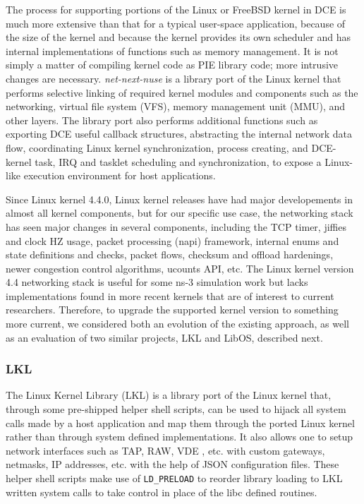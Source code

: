 \documentclass{sig-alternate}
\begin{document}
The process for supporting portions of the Linux or FreeBSD kernel in DCE is
much more extensive than that for a typical user-space application, because of
the size of the kernel and because the kernel provides its own scheduler and has internal implementations of functions such as memory management.  It is not
simply a matter of compiling kernel code as PIE library code; more intrusive
changes are necessary. 
\textit{net-next-nuse} is a library 
port of the Linux kernel that performs selective linking of required kernel modules and components such as the networking, virtual file system (VFS), memory management unit (MMU), and other layers.  The library port also performs additional functions such as
exporting DCE useful callback structures, abstracting the internal network data flow, coordinating Linux kernel synchronization, 
process creating, and DCE-kernel task, IRQ and tasklet scheduling and synchronization, to expose a Linux-like execution environment for host applications. 

Since Linux kernel 4.4.0, Linux kernel releases have had major developements in almost all kernel components, but for our specific use case,
the networking stack has seen major changes in several components, including the TCP timer, jiffies and clock HZ usage, packet processing (napi) framework, internal enums and state definitions and checks, packet flows, checksum and
offload hardenings, newer congestion control algorithms, ucounts API, etc. 
The Linux kernel version 4.4 networking stack is useful for some ns-3 simulation work but lacks implementations found in more recent kernels that are of interest to current researchers.  Therefore, to upgrade the supported kernel version to something more current, we considered both an evolution of the existing approach, as well as an evaluation of two similar projects, LKL and LibOS, described next. 

\subsubsection{LKL}
The Linux Kernel Library (LKL) is a library port of the Linux kernel that, through some pre-shipped helper shell scripts, can be used to hijack
all system calls made by a host application and map them through the ported Linux kernel rather than through system defined implementations. It also allows one 
to setup network interfaces such as TAP, RAW, VDE , etc. with custom gateways, netmasks, IP addresses, etc. with the help of JSON configuration files. These helper
shell scripts make use of \texttt{LD\_PRELOAD} to reorder library loading to LKL written system calls to take control in place of the libc defined routines.
 
\end{document}
